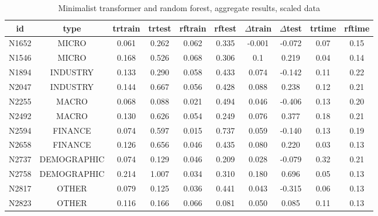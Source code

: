 \documentclass[algorithms,article,submit,pdftex,moreauthors]{Definitions/mdpi}
\begin{document}
\begin{table}[H]
\caption{Minimalist transformer and random forest, aggregate results, scaled data}
\label{tab:bestworse}
\centering
\begin{tabular}{cccccccccc}
\toprule
id   & type        & trtrain & trtest & rftrain & rftest & $\Delta$train & $\Delta$test & trtime & rftime \\
\midrule
N1652 & MICRO       & 0.061 & 0.262 & 0.062 & 0.335 & -0.001 &-0.072& 0.07&0.15\\
N1546 & MICRO       & 0.168 & 0.526 & 0.068 & 0.306 & 0.1   &  0.219& 0.04&0.14\\
N1894 & INDUSTRY    & 0.133 & 0.290 & 0.058 & 0.433 & 0.074 & -0.142&0.11&0.22\\
N2047 & INDUSTRY    & 0.144 & 0.667 & 0.056 & 0.428 & 0.088 &  0.238&0.12&0.21\\
N2255 & MACRO       & 0.068 & 0.088 & 0.021 & 0.494 & 0.046 & -0.406&0.13&0.20\\
N2492 & MACRO       & 0.130 & 0.626 & 0.054 & 0.249 & 0.076 &  0.377&0.18&0.21\\
N2594 & FINANCE     & 0.074 & 0.597 & 0.015 & 0.737 & 0.059 & -0.140&0.13&0.19\\
N2658 & FINANCE     & 0.126 & 0.656 & 0.046 & 0.435 & 0.080 &  0.220&0.03&0.13\\
N2737 & DEMOGRAPHIC & 0.074 & 0.129 & 0.046 & 0.209 & 0.028 & -0.079&0.32&0.21\\
N2758 & DEMOGRAPHIC & 0.214 & 1.007 & 0.034 & 0.310 & 0.180 &  0.696&0.05&0.13\\
N2817 & OTHER       & 0.079 & 0.125 & 0.036 & 0.441 & 0.043 & -0.315&0.06&0.13\\
N2823 & OTHER       & 0.116 & 0.166 & 0.066 & 0.081 & 0.050 &  0.085&0.11&0.13\\
\bottomrule
\end{tabular}
\end{table}
\end{document}
